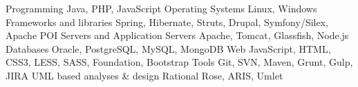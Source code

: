 

\begin{cvskills}

  \cvskill
    {Programming} %
    {Java, PHP, JavaScript} %
  \cvskill
    {Operating Systems} %
    {Linux, Windows} %
  \cvskill
    {Frameworks and libraries} %
    {Spring, Hibernate, Struts, Drupal, Symfony/Silex, Apache POI} %
  \cvskill
    {Servers and Application Servers} %
    {Apache, Tomcat, Glassfish, Node.js} %
  \cvskill
    {Databases} %
    {Oracle, PostgreSQL, MySQL, MongoDB} %
  \cvskill
    {Web} %
    {JavaScript, HTML, CSS3, LESS, SASS, Foundation, Bootstrap} %
  \cvskill
    {Tools} %
    {Git, SVN, Maven, Grunt, Gulp, JIRA} %
  \cvskill
    {UML based analyses \& design} %
    {Rational Rose, ARIS, Umlet} %
\end{cvskills}
